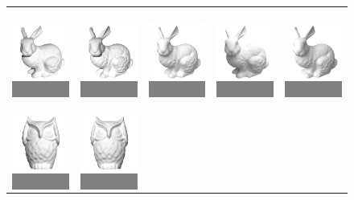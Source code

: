 \begin{figure}
\centering
\begin{tabular}{@{}c@{}c@{}c@{}c@{}c@{}}
\colorbox{Gray}{\includegraphics[height=2.8cm]{recons/bunny-input-01.png}} &
\colorbox{Gray}{\includegraphics[height=2.8cm]{recons/bunny-input-02.png}} &
\colorbox{Gray}{\includegraphics[height=2.8cm]{recons/bunny-input-03.png}} &
\colorbox{Gray}{\includegraphics[height=2.8cm]{recons/bunny-input-04.png}} &
\colorbox{Gray}{\includegraphics[height=2.8cm]{recons/bunny-input-05.png}}\\
\colorbox{Gray}{\includegraphics[height=2.8cm]{recons/owl-input-01.png}} &
\colorbox{Gray}{\includegraphics[height=2.8cm]{recons/owl-input-02.png}} &

\end{tabular}
\end{figure}

